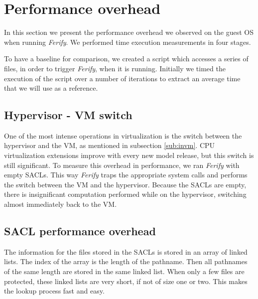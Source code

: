 \section{Performance overhead}\label{sec:performance}

In this section we present the performance overhead we observed on the guest \ac{OS} when running \emph{Ferify}. We performed time execution measurements in four stages. 

\par To have a baseline for comparison, we created a script which accesses a series of files, in order to trigger \emph{Ferify}, when it is running. Initially we timed the execution of the script over a number of iterations to extract an average time that we will use as a reference. 

\subsection{Hypervisor - \ac{VM} switch}

\par One of the most intense operations in virtualization is the switch between the hypervisor and the \ac{VM}, as mentioned in subsection \ref{sub:invm}. \ac{CPU} virtualization extensions improve with every new model release, but this switch is still significant. To measure this overhead in performance, we ran \emph{Ferify} with empty \acp{SACL}. This way \emph{Ferify} traps the appropriate system calls and performs the switch between the \ac{VM} and the hypervisor. Because the \acp{SACL} are empty, there is insignificant computation performed while on the hypervisor, switching almost immediately back to the \ac{VM}. 


\subsection{\ac{SACL} performance overhead}

\par The information for the files stored in the \acp{SACL} is stored in an array of linked lists. The index of the array is the length of the pathname. Then all pathnames of the same length are stored in the same linked list. When only a few files are protected, these linked lists are very short, if not of size one or two. This makes the lookup process fast and easy. 

